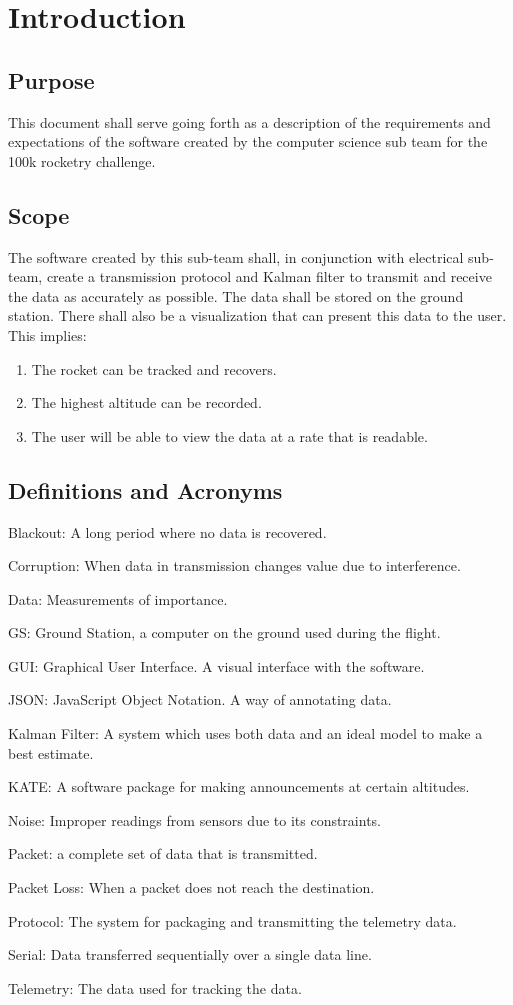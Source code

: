 \documentclass[onecolumn, draftclsnofoot,10pt, compsoc]{IEEEtran}
\begin{document}
\section{Introduction}
\subsection{Purpose}
This document shall serve going forth as a description of the requirements and
expectations of the software created by the computer science sub team for the 100k rocketry
challenge.
\subsection{Scope}
The software created by this sub-team shall, in conjunction with electrical sub-
team, create a transmission protocol and Kalman filter to transmit and receive the data as
accurately as possible. The data shall be stored on the ground station. There shall also be a
visualization that can present this data to the user. This implies:
 \begin{enumerate}
    \item The rocket can be tracked and recovers.
    \item The highest altitude can be recorded.
    \item The user will be able to view the data at a rate that is readable.
 \end{enumerate}
\subsection{Definitions and Acronyms}
Blackout: A long period where no data is recovered. \par
Corruption: When data in transmission changes value due to interference. \par
Data: Measurements of importance. \par
GS: Ground Station, a computer on the ground used during the flight. \par
GUI: Graphical User Interface. A visual interface with the software. \par
JSON: JavaScript Object Notation. A way of annotating data. \par
Kalman Filter: A system which uses both data and an ideal model to make a best estimate. \par
KATE: A software package for making announcements at certain altitudes. \par
Noise: Improper readings from sensors due to its constraints. \par
Packet: a complete set of data that is transmitted. \par
Packet Loss: When a packet does not reach the destination. \par
Protocol: The system for packaging and transmitting the telemetry data. \par
Serial: Data transferred sequentially over a single data line. \par
Telemetry: The data used for tracking the data. \par
\end{document}
